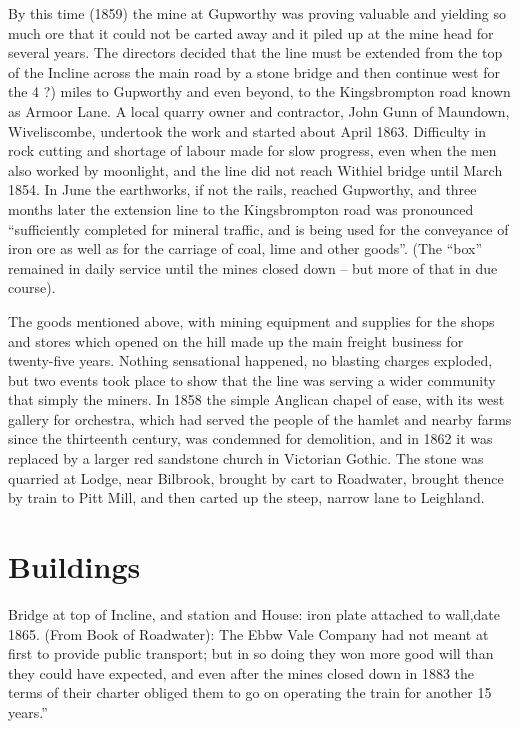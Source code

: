 \documentclass[10pt,a4paper]{article}
\begin{document}
By this time (1859) the mine at Gupworthy was proving valuable and yielding so much ore that it could not be carted away and it piled up at the mine head for several years. The directors decided that the line must be extended from the top of the Incline across the main road by a stone bridge and then continue west for the 4 ?) miles to Gupworthy and even beyond, to the Kingsbrompton road known as Armoor Lane. A local quarry owner and contractor, John Gunn of Maundown, Wiveliscombe, undertook the work and started about April   1863. Difficulty in rock cutting and shortage of labour made for slow progress, even when the men also worked by moonlight, and the line did not reach Withiel bridge until March 1854. In June the earthworks, if not the rails, reached Gupworthy, and three months later the extension line to the Kingsbrompton road was pronounced “sufficiently completed for mineral traffic, and is being used for the conveyance of iron ore as well as for the carriage of coal, lime and other goods”. (The “box” remained in daily service until the mines closed down – but more of that in due course).

The goods mentioned above, with mining equipment and supplies for the shops and stores which opened on the hill made up the  main freight business for twenty-five years. Nothing sensational happened, no blasting charges exploded, but two events took place to show that the line was serving a wider community that simply the miners.  In 1858 the simple Anglican chapel of ease, with its west gallery for orchestra,  which had served the people of the hamlet and nearby farms since the thirteenth century, was condemned for demolition, and in 1862 it was  replaced by a larger red sandstone church in Victorian Gothic. The stone was quarried at Lodge, near Bilbrook, brought by cart to Roadwater, brought thence by train to Pitt Mill, and then carted up the steep, narrow lane to Leighland.

\section{Buildings}

Bridge at top of Incline, and station and House: iron plate attached to wall,date 1865. 
   (From Book of Roadwater): The Ebbw Vale Company had not meant at first to provide  public transport; but in so doing they won more good will than they could have expected, and even after the mines closed down in 1883 the terms of their charter obliged them to go on operating the train for another  15 years.”
\end{document}
